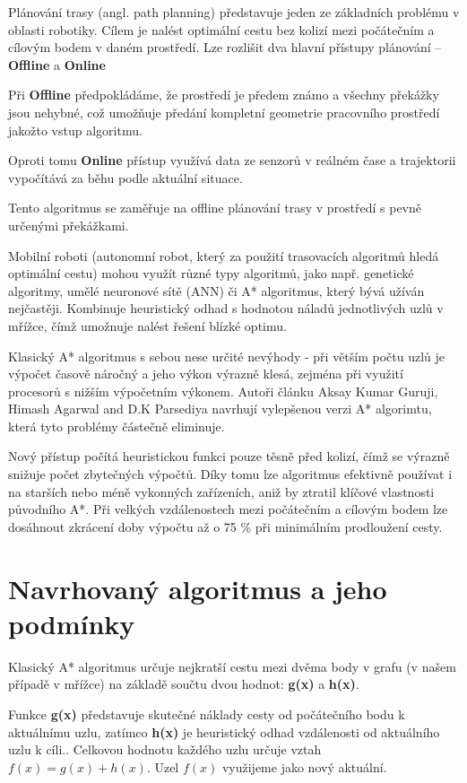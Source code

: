 \documentclass[10pt, a4paper]{article}
\begin{document}
Plánování trasy (angl. path planning) představuje jeden ze základních problému v oblasti robotiky. Cílem je nalést optimální cestu bez kolizí mezi počátečním a cílovým bodem v daném prostředí. Lze rozlišit dva hlavní přístupy plánování – \textbf{Offline} a \textbf{Online}

Při \textbf{Offline} předpokládáme, že prostředí je předem známo a všechny překážky jsou nehybné, což umožňuje předání kompletní geometrie pracovního prostředí jakožto vstup algoritmu.

Oproti tomu \textbf{Online} přístup využívá data ze senzorů v reálném čase a trajektorii vypočítává za běhu podle aktuální situace.

Tento algoritmus se zaměřuje na offline plánování trasy v prostředí s pevně určenými překážkami.

Mobilní roboti (autonomní robot, který za použití trasovacích algoritmů hledá optimální cestu) mohou využít různé typy algoritmů, jako např. genetické algoritmy, umělé neuronové sítě (ANN) či A* algoritmus, který bývá užíván nejčastěji. Kombinuje heuristický odhad s hodnotou náladů jednotlivých uzlů \newline v mřížce, čímž umožnuje nalést řešení blízké optimu.

Klasický A* algoritmus s sebou nese určité nevýhody - při větším počtu uzlů je výpočet časově náročný a jeho výkon výrazně klesá, zejména při využití procesorů s nižším výpočetním výkonem. Autoři článku Aksay Kumar Guruji, Himash Agarwal and D.K Parsediya navrhují vylepšenou verzi A* algorimtu, která tyto problémy částečně eliminuje.

Nový přístup počítá heuristickou funkci pouze těsně před kolizí, čímž se výrazně snižuje počet zbytečných výpočtů. Díky tomu lze algoritmus efektivně používat i na starších nebo méně vykonných zařízeních, aniž by ztratil klíčové vlastnosti původního A*.
Při velkých vzdálenostech mezi počátečním a cílovým bodem lze dosáhnout zkrácení doby výpočtu až o 75 \% při minimálním prodloužení cesty.

\newpage
\section{Navrhovaný algoritmus a jeho podmínky}
Klasický A* algoritmus určuje nejkratší cestu mezi dvěma body v grafu (v našem případě v mřížce) na základě součtu dvou hodnot: \textbf{g(x)} a \textbf{h(x)}.

Funkce \textbf{g(x)} představuje skutečné náklady cesty od počátečního bodu \newline k aktuálnímu uzlu, zatímco \textbf{h(x)} je heuristický odhad vzdálenosti od aktuálního uzlu k cíli.\cite{WikiAStar}.
Celkovou hodnotu každého uzlu určuje vztah $f(x) = g(x) + h(x)$.
Uzel $f(x)$ využijeme jako nový aktuální.
\end{document}
